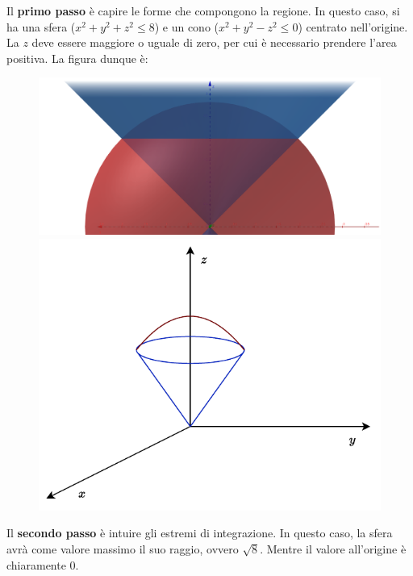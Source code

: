 \documentclass[a4paper]{article}
\begin{document}
	Il \textbf{primo passo} è capire le forme che compongono la regione. In questo caso, si ha una sfera ($x^{2} + y^{2} + z^{2} \le 8$) e un cono ($x^{2} + y^{2} - z^{2} \le 0$) centrato nell'origine. La $z$ deve essere maggiore o uguale di zero, per cui è necessario prendere l'area positiva. La figura dunque è:
	\begin{figure}[!htp]
		\centering
		\includegraphics[width=\textwidth]{img/integrazione_per_strati_3.png}
		\includegraphics[width=.7\textwidth]{img/integrazione_per_strati.pdf}
	\end{figure}

	\noindent
	Il \textbf{secondo passo} è intuire gli estremi di integrazione. In questo caso, la sfera avrà come valore massimo il suo raggio, ovvero $\sqrt{8}$. Mentre il valore all'origine è chiaramente $0$.
\end{document}
